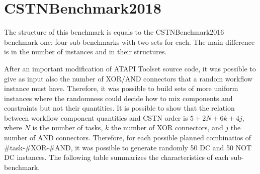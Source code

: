 \documentclass[a4paper,11pt]{article}
\begin{document}
\section{CSTNBenchmark2018}

The structure of this benchmark is equals to the CSTNBenchmark2016 benchmark one: four sub-benchmarks with two sets for each. 
The main difference is in the number of instances and in their structures.

After an important modification of ATAPI Toolset source code, it was possible to give as input also the number of XOR\slash AND connectors that a random workflow instance must have.
Therefore, it was possible to build sets of more uniform instances where the randomness could decide how to mix components and constraints but not their quantities.
It is possible to show that the relation between workflow component quantities and CSTN order is $5+2N+6k+4j$, where $N$ is the number of tasks, $k$ the number of XOR connectors, and $j$ the number of AND connectors. 
Therefore, for each possible planned combinatios of \#task-\#XOR-\#AND, it was possible to generate randomly 50 DC and 50 NOT DC instances.
The following table summarizes the characteristics of each sub-benchmark.
\end{document}
